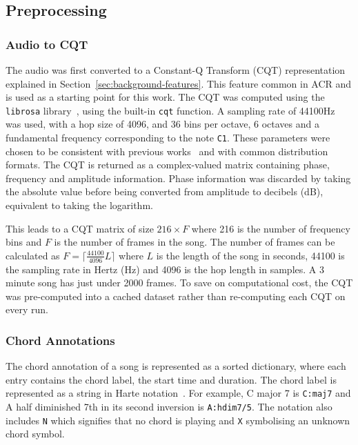 \subsection{Preprocessing}

\subsubsection{Audio to CQT}\label{sec:audio-to-cqt}

The audio was first converted to a Constant-Q Transform (CQT) representation explained in Section~\ref{sec:background-features}. This feature common in ACR and is used as a starting point for this work. The CQT was computed using the \texttt{librosa} library~\citep{librosa}, using the built-in \texttt{cqt} function. A sampling rate of 44100Hz was used, with a hop size of 4096, and 36 bins per octave, 6 octaves and a fundamental frequency corresponding to the note \texttt{C1}. These parameters were chosen to be consistent with previous works~\citep{StructuredTraining} and with common distribution formats. The CQT is returned as a complex-valued matrix containing phase, frequency and amplitude information. Phase information was discarded by taking the absolute value before being converted from amplitude to decibels (dB), equivalent to taking the logarithm.

This leads to a CQT matrix of size $216 \times F$ where 216 is the number of frequency bins and $F$ is the number of frames in the song. The number of frames can be calculated as $F = \lceil \frac{44100}{4096} L  \rceil$ where $L$ is the length of the song in seconds, 44100 is the sampling rate in Hertz (Hz) and 4096 is the hop length in samples. A 3 minute song has just under 2000 frames. To save on computational cost, the CQT was pre-computed into a cached dataset rather than re-computing each CQT on every run.

\subsubsection{Chord Annotations}\label{sec:chord-annotations}

The chord annotation of a song is represented as a sorted dictionary, where each entry contains the chord label, the start time and duration. The chord label is represented as a string in Harte notation~\citep{HarteNotation}. For example, C major 7 is \texttt{C:maj7} and A half diminished 7th in its second inversion is \texttt{A:hdim7/5}. The notation also includes \texttt{N} which signifies that no chord is playing and \texttt{X} symbolising an unknown chord symbol.

